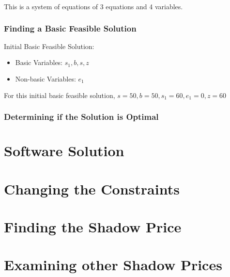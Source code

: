 \documentclass{article}
\begin{document}
This is a system of equations of 3 equations and 4 variables.


\subsubsection{Finding a Basic Feasible Solution}

Initial Basic Feasible Solution:
\begin{itemize}
    \item Basic Variables: $s_1, b, s, z$
    \item Non-basic Variables: $e_1$
\end{itemize}

For this initial basic feasible solution, 
$s = 50,b = 50,s_1 = 60,e_1 = 0, z = 60$

\subsubsection{Determining if the Solution is Optimal}



\section{Software Solution}

\section{Changing the Constraints}

\section{Finding the Shadow Price}

\section{Examining other Shadow Prices}
\end{document}
